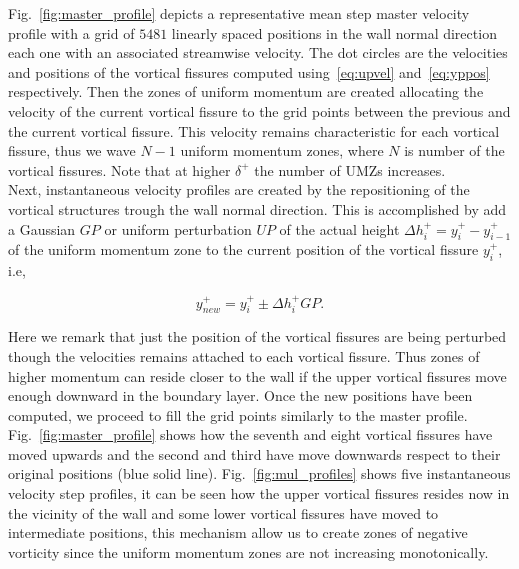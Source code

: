 \documentclass[aps,reprint,amsmath,amssymb,pra]{revtex4-1}%
\begin{document}
Fig.~\ref{fig:master_profile} depicts a representative mean step master velocity profile with a grid of $5481$ linearly spaced positions in the wall normal direction each one with an associated streamwise velocity. The dot circles are the velocities and positions of the vortical fissures computed using~\eqref{eq:upvel} and~\eqref{eq:yppos} respectively. Then the zones of uniform momentum are created allocating the velocity of the current vortical fissure to the grid points between the previous and the current vortical fissure. This velocity remains characteristic for each vortical fissure, thus we wave $N-1$ uniform momentum zones, where $N$ is number of the vortical fissures. Note that at higher $\delta^+$ the number of UMZs increases.\\
Next, instantaneous velocity profiles are created by the repositioning of the vortical structures trough the wall normal direction. This is accomplished by add a Gaussian $GP$ or uniform perturbation $UP$ of the actual height $\Delta h^+_i=y^+_i-y^+_{i-1}$ of the uniform momentum zone to the current position of the vortical fissure $y^+_i$, i.e, 

\begin{equation}\label{eq:ypert}
y^+_{new}=y^+_i\pm \Delta h^+_i GP.
\end{equation}

Here we remark that just the position of the vortical fissures are being perturbed though the velocities remains attached to each vortical fissure. Thus zones of higher momentum can reside closer to the wall if the upper vortical fissures move enough downward in the boundary layer. Once the new positions have been computed, we proceed to fill the grid points similarly to the master profile. Fig.~\ref{fig:master_profile} shows how the seventh and eight vortical fissures have moved upwards and the second and third have move downwards respect to their original positions (blue solid line).  Fig.~\ref{fig:mul_profiles} shows five instantaneous velocity step profiles,  it can be seen how the upper vortical fissures resides now in the vicinity of the wall and some lower vortical fissures have moved to intermediate positions, this mechanism allow us to create zones of negative vorticity since the  uniform momentum zones are not increasing monotonically. 
\end{document}
